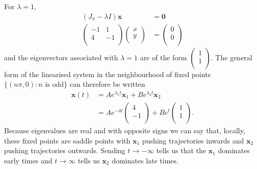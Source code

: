 \documentclass[10pt]{article}
\begin{document}
\begin{enumerate}
        For $\lambda = 1$,
        \begin{align*}
          (J_\pi - \lambda I)\mathbf{x} &= \mathbf{0} \\
          \begin{pmatrix}
            -1 & 1 \\
            4 & -1 \\
          \end{pmatrix}
          \begin{pmatrix}
            x \\
            y \\
          \end{pmatrix}
          &=
          \begin{pmatrix}
            0 \\
            0 \\
          \end{pmatrix}
        \end{align*}
        and the eigenvectors associated with $\lambda = 1$ are of the form $
          \begin{pmatrix}
            1 \\
            1 \\
          \end{pmatrix}$. The general form of the linearised system in the
          neighbourhood of fixed points $\{(n\pi,0):n \text{ is odd}\}$ can
          therefore be written
          \begin{align*}
            \mathbf{x}(t) &= Ae^{\lambda_1t}\mathbf{x}_1+Be^{\lambda_2t}\mathbf{x}_2 \\
             &= Ae^{-4t}
          \begin{pmatrix}
            4 \\
            -1 \\
          \end{pmatrix}
          + Be^t
          \begin{pmatrix}
            1 \\
            1 \\
          \end{pmatrix}.
          \end{align*}
          Because eigenvalues are real and with opposite signs we can say that,
          locally, these fixed points are saddle points with
          $\mathbf{x}_1$ pushing trajectories inwards and
          $\mathbf{x}_2$ pushing trajectories outwards. Sending $t \rightarrow
          -\infty$ tells us that the $\mathbf{x}_1$ dominates early
          times and $t \rightarrow \infty$ tells us $\mathbf{x}_2$ dominates
          late times.


\end{enumerate}
\end{document}
